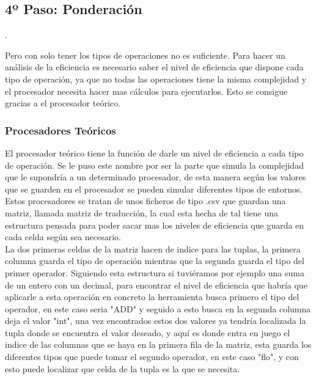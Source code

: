 \subsection{4º Paso: Ponderación}.

Pero con solo tener los tipos de operaciones no es suficiente. Para hacer un análisis de la eficiencia es necesario saber el nivel de eficiencia que dispone cada tipo de operación, ya que no todas las operaciones tiene la misma complejidad y el procesador necesita hacer mas cálculos para ejecutarlos. Esto se consigue gracias a el procesador teórico.\\

\subsubsection{Procesadores Teóricos}
El procesador teórico tiene la función de darle un nivel de eficiencia a cada tipo de operación. Se le puso este nombre por ser la parte que simula la complejidad que le supondría a un determinado procesador, de esta manera según los valores que se guarden en el procesador se pueden simular diferentes tipos de entornos.\\

Estos procesadores se tratan de unos ficheros de tipo .csv que guardan una matriz, llamada matriz de traducción, la cual esta hecha de tal tiene una estructura pensada para poder sacar mas los  niveles de eficiencia  que guarda en cada celda según sea necesario.\\

La dos primeras celdas de la matriz hacen de indice para las tuplas, la primera columna guarda el tipo de operación mientras que la segunda guarda el tipo del primer operador. Siguiendo esta estructura si tuviéramos por ejemplo una suma de un entero con un decimal, para encontrar el nivel de eficiencia que habría que aplicarle a esta operación en concreto la herramienta busca primero el tipo del operador, en este caso seria "ADD" y seguido a  esto busca en la segunda columna deja el valor "int", una vez  encontrados  estos dos valores ya tendría localizada la tupla donde se encuentra  el valor  deseado, y aquí es donde  entra en juego el indice de las  columnas que se haya en la primera fila de la matriz, esta  guarda los diferentes tipos que puede tomar el segundo operador, en este caso "flo", y con esto puede localizar que celda de la tupla es la que se necesita.

